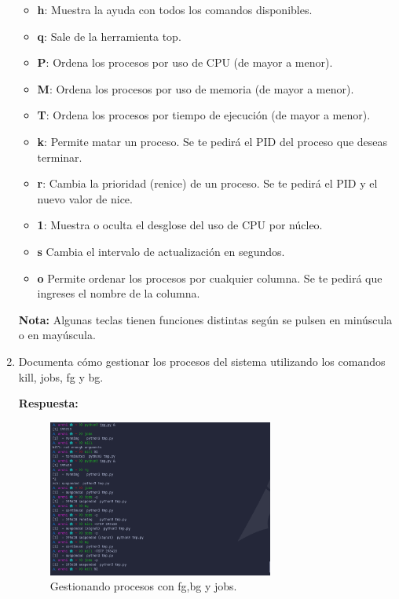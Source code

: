 \documentclass[a4paper,12pt]{article}
\begin{document}
\begin{enumerate}[label=\textbf{Pregunta \arabic*.}]


    \begin{itemize}
        \item \textbf{h}: Muestra la ayuda con todos los comandos disponibles.
        \item \textbf{q}: Sale de la herramienta top.
        \item \textbf{P}: Ordena los procesos por uso de CPU (de mayor a menor).
        \item \textbf{M}: Ordena los procesos por uso de memoria (de mayor a menor).
        \item \textbf{T}: Ordena los procesos por tiempo de ejecución (de mayor a menor).
        \item \textbf{k}: Permite matar un proceso. Se te pedirá el PID del proceso que deseas terminar.
        \item \textbf{r}: Cambia la prioridad (renice) de un proceso. Se te pedirá el PID y el nuevo valor de nice.
        \item \textbf{1}: Muestra o oculta el desglose del uso de CPU por núcleo.
        \item \textbf{s} Cambia el intervalo de actualización en segundos.
        \item \textbf{o} Permite ordenar los procesos por cualquier columna. Se te pedirá que ingreses el nombre de la columna.
        
    \end{itemize}

    \textbf{Nota:} Algunas teclas tienen funciones distintas según se pulsen en minúscula o en mayúscula.




    \item Documenta cómo gestionar los procesos del sistema utilizando los comandos kill,
    jobs, fg y bg.

    \textbf{Respuesta:}

    \begin{figure}[h!]
        \centering
        \includegraphics[width=0.7\textwidth]{5.png}
        \caption{Gestionando procesos con fg,bg y jobs.}
    \end{figure}


\end{enumerate}
\end{document}
